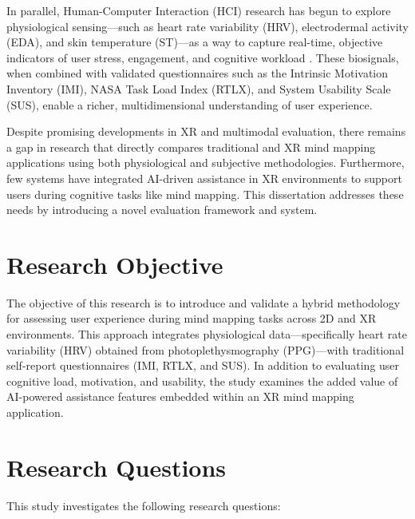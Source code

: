 \documentclass{CPP}
\begin{document}
In parallel, Human-Computer Interaction (HCI) research has begun to explore physiological sensing—such as heart rate variability (HRV), electrodermal activity (EDA), and skin temperature (ST)—as a way to capture real-time, objective indicators of user stress, engagement, and cognitive workload \citep{Mehler2012, Fine2022}. These biosignals, when combined with validated questionnaires such as the Intrinsic Motivation Inventory (IMI), NASA Task Load Index (RTLX), and System Usability Scale (SUS), enable a richer, multidimensional understanding of user experience.


Despite promising developments in XR and multimodal evaluation, there remains a gap in research that directly compares traditional and XR mind mapping applications using both physiological and subjective methodologies. Furthermore, few systems have integrated AI-driven assistance in XR environments to support users during cognitive tasks like mind mapping. This dissertation addresses these needs by introducing a novel evaluation framework and system.

\section{Research Objective}

The objective of this research is to introduce and validate a hybrid methodology for assessing user experience during mind mapping tasks across 2D and XR environments. This approach integrates physiological data—specifically heart rate variability (HRV) obtained from photoplethysmography (PPG)—with traditional self-report questionnaires (IMI, RTLX, and SUS). In addition to evaluating user cognitive load, motivation, and usability, the study examines the added value of AI-powered assistance features embedded within an XR mind mapping application.

\section{Research Questions}

This study investigates the following research questions:
\end{document}
